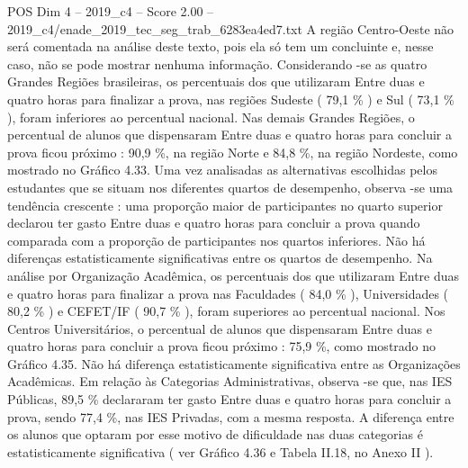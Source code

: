 \begin{textsample}{POS Dim 4 – 2019\_c4 – Score 2.00 – 2019\_c4/enade\_2019\_tec\_seg\_trab\_6283ea4ed7.txt}
A região Centro-Oeste não será comentada na análise deste texto, pois ela só tem um concluinte e, nesse caso, não se pode mostrar nenhuma informação.
Considerando -se as quatro Grandes Regiões brasileiras, os percentuais dos que utilizaram Entre duas e quatro horas para finalizar a prova, nas regiões Sudeste ( 79,1 \% ) e Sul ( 73,1 \% ), foram inferiores ao percentual nacional.
Nas demais Grandes Regiões, o percentual de alunos que dispensaram Entre duas e quatro horas para concluir a prova ficou próximo : 90,9 \%, na região Norte e 84,8 \%, na região Nordeste, como mostrado no Gráfico 4.33.
Uma vez analisadas as alternativas escolhidas pelos estudantes que se situam nos diferentes quartos de desempenho, observa -se uma tendência crescente : uma proporção maior de participantes no quarto superior declarou ter gasto Entre duas e quatro horas para concluir a prova quando comparada com a proporção de participantes nos quartos inferiores.
Não há diferenças estatisticamente significativas entre os quartos de desempenho.
Na análise por Organização Acadêmica, os percentuais dos que utilizaram Entre duas e quatro horas para finalizar a prova nas Faculdades ( 84,0 \% ), Universidades ( 80,2 \% ) e CEFET/IF ( 90,7 \% ), foram superiores ao percentual nacional.
Nos Centros Universitários, o percentual de alunos que dispensaram Entre duas e quatro horas para concluir a prova ficou próximo : 75,9 \%, como mostrado no Gráfico 4.35.
Não há diferença estatisticamente significativa entre as Organizações Acadêmicas.
Em relação às Categorias Administrativas, observa -se que, nas IES Públicas, 89,5 \% declararam ter gasto Entre duas e quatro horas para concluir a prova, sendo 77,4 \%, nas IES Privadas, com a mesma resposta.
A diferença entre os alunos que optaram por esse motivo de dificuldade nas duas categorias é estatisticamente significativa ( ver Gráfico 4.36 e Tabela II.18, no Anexo II ).

\end{textsample}
